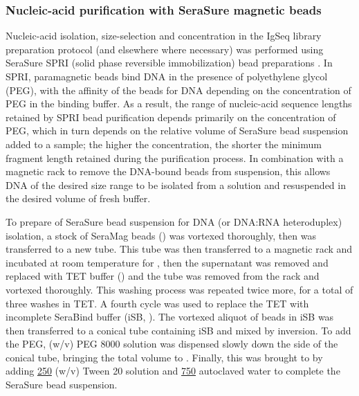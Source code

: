 \subsubsection{Nucleic-acid purification with SeraSure magnetic beads}
\label{sec:methods_molec_standard_serasure}

Nucleic-acid isolation, size-selection and concentration in the IgSeq library preparation protocol (and elsewhere where necessary) was performed using SeraSure SPRI (solid phase reversible immobilization) bead preparations \parencite{hawkins1994spri,deangelis1995spri,lennon2010cleanup,fisher2011cleanup}. In SPRI, paramagnetic beads bind DNA in the presence of polyethylene glycol (PEG), with the affinity of the beads for DNA depending on the concentration of PEG in the binding buffer. As a result, the range of nucleic-acid sequence lengths retained by SPRI bead purification depends primarily on the concentration of PEG, which in turn depends on the relative volume of SeraSure bead suspension added to a sample; the higher the concentration, the shorter the minimum fragment length retained during the purification process. In combination with a magnetic rack to remove the DNA-bound beads from suspension, this allows DNA of the desired size range to be isolated from a solution and resuspended in the desired volume of fresh buffer.

To prepare  of SeraSure bead suspension for DNA (or DNA:RNA heteroduplex) isolation, a stock of SeraMag beads () was vortexed thoroughly, then  was transferred to a new tube. This tube was then transferred to a magnetic rack and incubated at room temperature for , then the supernatant was removed and replaced with  TET buffer () and the tube was removed from the rack and vortexed thoroughly. This washing process was repeated twice more, for a total of three washes in TET. A fourth cycle was used to replace the TET with incomplete SeraBind buffer (iSB, ). The vortexed  aliquot of beads in iSB was then transferred to a conical tube containing  iSB and mixed by inversion. To add the PEG,   (w/v) PEG 8000 solution was dispensed slowly down the side of the conical tube, bringing the total volume to . Finally, this was brought to  by adding \ul{250}  (w/v) Tween 20 solution and \ul{750} autoclaved water to complete the SeraSure bead suspension.

